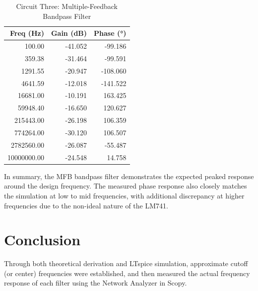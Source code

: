 \documentclass[12pt]{article}
\begin{document}
\begin{table}[H]
	\centering
	\begin{tabular}{|r|r|r|}
		\hline
		\textbf{Freq (Hz)} & \textbf{Gain (dB)} & \textbf{Phase (°)} \\
		\hline
		100.00             & -41.052            & -99.186            \\
		359.38             & -31.464            & -99.591            \\
		1291.55            & -20.947            & -108.060           \\
		4641.59            & -12.018            & -141.522           \\
		16681.00           & -10.191            & 163.425            \\
		59948.40           & -16.650            & 120.627            \\
		215443.00          & -26.198            & 106.359            \\
		774264.00          & -30.120            & 106.507            \\
		2782560.00         & -26.087            & -55.487            \\
		10000000.00        & -24.548            & 14.758             \\
		\hline
	\end{tabular}
	\caption{Circuit Three: Multiple-Feedback Bandpass Filter}
	\label{tab:C3_MFB_full}
\end{table}

In summary, the MFB bandpass filter demonstrates the expected peaked response
around the design frequency. The measured phase response also closely matches
the simulation at low to mid frequencies, with additional discrepancy at higher
frequencies due to the non-ideal nature of the LM741.

\section{Conclusion}
Through both theoretical derivation and LTspice simulation,
approximate cutoff (or center) frequencies were established, and then measured the actual
frequency response of each filter using the Network Analyzer in Scopy.
\end{document}
